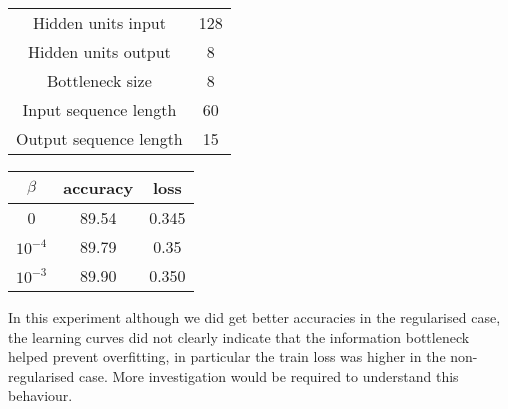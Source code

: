 \documentclass[11pt,oneside,openright]{report}
\begin{document}
 \begin{minipage}{0.5\textwidth}
        \centering
\begin{tabular}{ c | c  }
 Hidden units input & 128 \\
 Hidden units output & 8 \\
 Bottleneck size & 8 \\
 Input sequence length & 60 \\
 Output sequence length & 15 \\
\end{tabular}
    \end{minipage}\hfill
    \begin{minipage}{0.5\textwidth}
        \centering
\begin{tabular}{ c | c c }
 $\beta$ & accuracy & loss \\
 \hline
0  &  89.54  & 0.345 \\
$10^{-4}$  & 89.79 & 0.35  \\
$10^{-3}$  & 89.90 & 0.350  \\
\end{tabular}
    \end{minipage}
    
In this experiment although we did get better accuracies in the regularised case, the learning curves did not clearly indicate that the information bottleneck helped prevent overfitting, in particular the train loss was higher in the non-regularised case. More investigation would be required to understand this behaviour.
\end{document}
